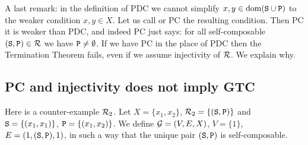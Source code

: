\documentclass{lmcs}
\begin{document}
%

A last remark: in the definition of PDC we cannot simplify 
$x, y \in {\rm dom}({\tt S} \cup {\tt P})$ to the weaker condition
$x, y \in X$. Let us call  or 
PC the resulting condition. Then PC it is weaker than PDC,
and indeed PC just says:
for all self-composable $({\tt S},{\tt P}) \in {\mathcal R}$ we have ${\tt P} \not = \emptyset$.
If we have PC in the place of PDC then the Termination Theorem fails, even if
we assume injectivity
of ${\mathcal R}$. We explain why.

\subsection{PC and injectivity does not imply GTC}
\label{subsubsection-counterexample-PC-PDC}
Here is a counter-example ${\mathcal R}_2$. 
Let $X = \{x_1,x_2\}$, ${\mathcal R}_2=\{({\tt S},{\tt P})\}$
and ${\tt S} =\{(x_1,x_1)\}$, ${\tt P} =\{(x_1,x_2)\}$. 
We define ${\mathcal G}=(V,E,X)$, $V=\{1\}$, $E=(1,({\tt S},{\tt P}),1)$, 
in such a way that the unique pair $({\tt S},{\tt P})$ is self-composable. 
\end{document}
